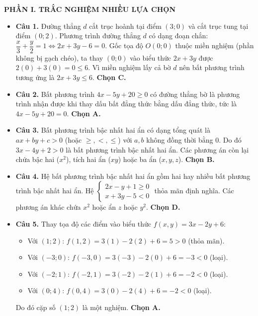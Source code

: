 \documentclass[12pt,a4paper]{article}
\newcommand{\parttitle}[1]{\par\vspace{2pt}{\large\bfseries\color{ink}#1}\par\vspace{1pt}}
\begin{document}
\newpage
\parttitle{HƯỚNG DẪN GIẢI CHI TIẾT}

\textbf{\large PHẦN I. TRẮC NGHIỆM NHIỀU LỰA CHỌN}

\begin{itemize}[leftmargin=0.6cm, itemsep=4pt]
\item \textbf{Câu 1.} Đường thẳng $d$ cắt trục hoành tại điểm $(3; 0)$ và cắt trục tung tại điểm $(0; 2)$. Phương trình đường thẳng $d$ có dạng đoạn chắn: $\dfrac{x}{3} + \dfrac{y}{2} = 1 \iff 2x + 3y - 6 = 0$. Gốc tọa độ $O(0; 0)$ thuộc miền nghiệm (phần không bị gạch chéo), ta thay $(0; 0)$ vào biểu thức $2x + 3y$ được $2(0) + 3(0) = 0 \le 6$. Vì miền nghiệm lấy cả bờ $d$ nên bất phương trình tương ứng là $2x + 3y \le 6$. \textbf{Chọn C.}

\item \textbf{Câu 2.} Bất phương trình $4x - 5y + 20 \ge 0$ có đường thẳng bờ là phương trình nhận được khi thay dấu bất đẳng thức bằng dấu đẳng thức, tức là $4x - 5y + 20 = 0$. \textbf{Chọn A.}

\item \textbf{Câu 3.} Bất phương trình bậc nhất hai ẩn có dạng tổng quát là $ax + by + c > 0$ (hoặc $\ge, <, \le$) với $a, b$ không đồng thời bằng $0$. Do đó $3x - 4y + 2 > 0$ là bất phương trình bậc nhất hai ẩn. Các phương án còn lại chứa bậc hai ($x^2$), tích hai ẩn ($xy$) hoặc ba ẩn ($x, y, z$). \textbf{Chọn B.}

\item \textbf{Câu 4.} Hệ bất phương trình bậc nhất hai ẩn gồm hai hay nhiều bất phương trình bậc nhất hai ẩn. Hệ $\begin{cases} 2x - y + 1 \ge 0 \\ x + 3y - 5 < 0 \end{cases}$ thỏa mãn định nghĩa. Các phương án khác chứa $x^2$ hoặc ẩn $z$ hoặc $y^2$. \textbf{Chọn D.}

\item \textbf{Câu 5.} Thay tọa độ các điểm vào biểu thức $f(x, y) = 3x - 2y + 6$:
\begin{itemize}
    \item Với $(1; 2)$: $f(1, 2) = 3(1) - 2(2) + 6 = 5 > 0$ (thỏa mãn).
    \item Với $(-3; 0)$: $f(-3, 0) = 3(-3) - 2(0) + 6 = -3 < 0$ (loại).
    \item Với $(-2; 1)$: $f(-2, 1) = 3(-2) - 2(1) + 6 = -2 < 0$ (loại).
    \item Với $(0; 4)$: $f(0, 4) = 3(0) - 2(4) + 6 = -2 < 0$ (loại).
\end{itemize}
Do đó cặp số $(1; 2)$ là một nghiệm. \textbf{Chọn A.}


\end{itemize}
\end{document}
